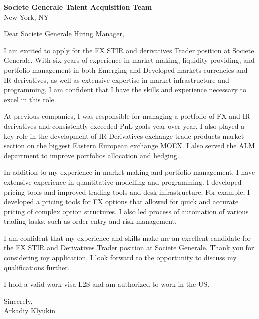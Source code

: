 \documentclass{letter}
\begin{document}
\begin{letter}{\textbf{Societe Generale Talent Acquisition Team} \\
                New York, NY}


\opening{Dear Societe Generale Hiring Manager,}

I am excited to apply for the FX STIR and derivatives Trader position at Societe Generale. With six years of experience in market making, liquidity providing, and portfolio management in both Emerging and Developed markets currencies and IR derivatives, as well as extensive expertise in market infrastructure and programming, I am confident that I have the skills and experience necessary to excel in this role.

At previous companies, I was responsible for managing a portfolio of FX and IR derivatives and consistently exceeded PnL goals year over year. I also played a key role in the development of IR Derivatives exchange trade products market section on the biggest Eastern European exchange MOEX. I also served the ALM department to improve portfolios allocation and hedging.

In addition to my experience in market making and portfolio management, I have extensive experience in quantitative modelling and programming. I developed pricing tools and improved trading tools and desk infrastructure. For example, I developed a pricing tools for FX options that allowed for quick and accurate pricing of complex option structures. I also led process of automation of various trading tasks, such as order entry and risk management.

I am confident that my experience and skills make me an excellent candidate for the FX STIR and Derivatives Trader position at Societe Generale. Thank you for considering my application, I look forward to the opportunity to discuss my qualifications further.

I hold a valid work visa L2S and am authorized to work in the US.

Sincerely,\\
Arkadiy Klyukin
\end{letter}
\end{document}
